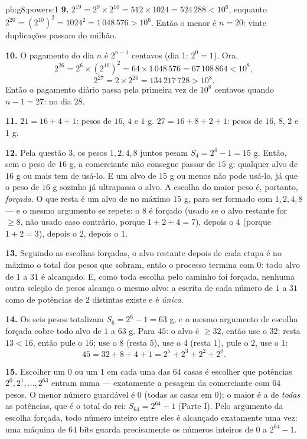\begin{solution}{pb:g8:powers:1}
\textbf{9.} $2^{19} = 2^9 \times 2^{10} = 512 \times 1024 =
524\,288 < 10^6$, enquanto
$2^{20} = \left(2^{10}\right)^2 = 1024^2 = 1\,048\,576 > 10^6$. Então o
menor  é $n = 20$: vinte duplicações passam do milhão.

\textbf{10.} O pagamento do dia $n$ é $2^{n-1}$ centavos (dia 1:
$2^0 = 1$). Ora,
\[
2^{26} = 2^6 \times \left(2^{10}\right)^2
= 64 \times 1\,048\,576 = 67\,108\,864 < 10^8,
\]
\[
2^{27} = 2 \times 2^{26} = 134\,217\,728 > 10^8 .
\]
Então o pagamento diário passa pela primeira vez de $10^8$ centavos
quando $n - 1 = 27$: no dia $28$.

\textbf{11.} $21 = 16 + 4 + 1$: pesos de $16$, $4$ e $1$ g.
$27 = 16 + 8 + 2 + 1$: pesos de $16$, $8$, $2$ e $1$ g.

\textbf{12.} Pela questão 3, os pesos $1, 2, 4, 8$ juntos pesam
$S_4 = 2^4 - 1 = 15$ g. Então, sem o peso de $16$ g, a comerciante não
consegue passar de $15$ g: qualquer alvo de $16$ g ou mais tem de
usá-lo. E um alvo de $15$ g ou menos não pode usá-lo, já que o peso de
$16$ g sozinho já ultrapassa o alvo. A escolha do maior peso é,
portanto, \emph{forçada}. O que resta é um alvo de no máximo $15$ g,
para ser formado com $1, 2, 4, 8$ --- e o mesmo argumento se repete: o
$8$ é forçado (usado se o alvo restante for $\geq 8$, não usado caso
contrário, porque $1 + 2 + 4 = 7$), depois o $4$ (porque
$1 + 2 = 3$), depois o $2$, depois o $1$.

\textbf{13.} Seguindo as escolhas forçadas, o alvo restante depois de
cada etapa é no máximo o total dos pesos que sobram, então o processo
termina com  $0$: todo alvo de $1$ a $31$ é alcançado. E, como
toda escolha pelo caminho foi forçada, nenhuma outra seleção de pesos
alcança o mesmo alvo: a escrita de cada número de $1$ a $31$ como 
de potências de $2$ distintas existe e é \emph{única}.

\textbf{14.} Os seis pesos totalizam $S_6 = 2^6 - 1 = 63$ g, e o mesmo
argumento de escolha forçada cobre todo alvo de $1$ a $63$ g. Para
$45$: o alvo é $\geq 32$, então use o $32$; resta $13 < 16$, então pule
o $16$; use o $8$ (resta $5$), use o $4$ (resta $1$), pule o $2$, use o
$1$:
\[
45 = 32 + 8 + 4 + 1 = 2^5 + 2^3 + 2^2 + 2^0 .
\]

\textbf{15.} Escolher um $0$ ou um $1$ em cada uma das $64$ casas é
escolher que potências $2^0, 2^1, \dots, 2^{63}$ entram numa  ---
exatamente a pesagem da comerciante com $64$ pesos. O menor número
guardável é $0$ (todas as casas em $0$); o maior é a  de
\emph{todas} as potências, que é o total do rei:
$S_{64} = 2^{64} - 1$ (Parte I). Pelo argumento da escolha forçada,
todo número inteiro entre eles é alcançado exatamente uma vez: uma
máquina de $64$ bits guarda precisamente os números inteiros de $0$ a
$2^{64} - 1$.
\end{solution}
